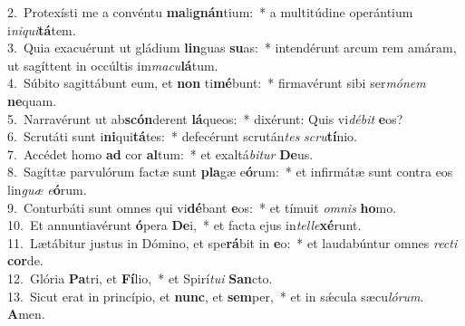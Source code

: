 {2.~}Protexísti me a convéntu \textbf{ma}li\textbf{gnán}tium:~* a multitúdine operántium i\textit{ni}\textit{qui}\textbf{tá}tem.\\
{3.~}Quia exacuérunt ut gládium \textbf{lin}guas \textbf{su}as:~* intendérunt arcum rem amáram, ut sagíttent in occúltis im\textit{ma}\textit{cu}\textbf{lá}tum.\\
{4.~}Súbito sagittábunt eum, et \textbf{non} ti\textbf{mé}bunt:~* firmavérunt sibi ser\textit{mó}\textit{nem} \textbf{ne}quam.\\
{5.~}Narravérunt ut ab\textbf{scón}derent \textbf{lá}queos:~* dixérunt: Quis vi\textit{dé}\textit{bit} \textbf{e}os?\\
{6.~}Scrutáti sunt i\textbf{ni}qui\textbf{tá}tes:~* defecérunt scrután\textit{tes} \textit{scru}\textbf{tí}nio.\\
{7.~}Accédet homo \textbf{ad} cor \textbf{al}tum:~* et exaltá\textit{bi}\textit{tur} \textbf{De}us.\\
{8.~}Sagíttæ parvulórum factæ sunt \textbf{pla}gæ e\textbf{ó}rum:~* et infirmátæ sunt contra eos lin\textit{guæ} \textit{e}\textbf{ó}rum.\\
{9.~}Conturbáti sunt omnes qui vi\textbf{dé}bant \textbf{e}os:~* et tímuit \textit{om}\textit{nis} \textbf{ho}mo.\\
{10.~}Et annuntiavérunt \textbf{ó}pera \textbf{De}i,~* et facta ejus in\textit{tel}\textit{le}\textbf{xé}runt.\\
{11.~}Lætábitur justus in Dómino, et spe\textbf{rá}bit in \textbf{e}o:~* et laudabúntur omnes \textit{re}\textit{cti} \textbf{cor}de.\\
{12.~}Glória \textbf{Pa}tri, et \textbf{Fí}lio,~* et Spirí\textit{tu}\textit{i} \textbf{San}cto.\\
{13.~}Sicut erat in princípio, et \textbf{nunc}, et \textbf{sem}per,~* et in sǽcula sæcu\textit{ló}\textit{rum}. \textbf{A}men.\\
